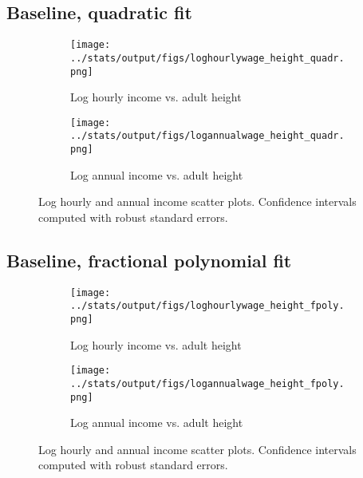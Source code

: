 \subsection{Baseline, quadratic fit}
\begin{figure}[htbp]
	\begin{subfigure}[b]{0.9\textwidth}
		\centering
		\texttt{[image: ../stats/output/figs/loghourlywage\_height\_quadr.png]}	
		\label{fig:loghourlywageheight}
		\caption{Log hourly income vs. adult height}
	\end{subfigure}
	
	\begin{subfigure}[b]{0.9\textwidth}
		\centering
		\texttt{[image: ../stats/output/figs/logannualwage\_height\_quadr.png]}	
		\label{fig:logannualwageheight}
		\caption{Log annual income vs. adult height}
	\end{subfigure}
	\caption{Log hourly and annual income scatter plots. Confidence intervals computed with robust standard errors.}
\end{figure}


\clearpage
\subsection{Baseline, fractional polynomial fit}
\begin{figure}[htbp]
	\begin{subfigure}[b]{0.9\textwidth}
		\centering
		\texttt{[image: ../stats/output/figs/loghourlywage\_height\_fpoly.png]}	
		\label{fig:loghourlywageheight}
		\caption{Log hourly income vs. adult height}
	\end{subfigure}
	
	\begin{subfigure}[b]{0.9\textwidth}
		\centering
		\texttt{[image: ../stats/output/figs/logannualwage\_height\_fpoly.png]}	
		\label{fig:logannualwageheight}
		\caption{Log annual income vs. adult height}
	\end{subfigure}
	\caption{Log hourly and annual income scatter plots. Confidence intervals computed with robust standard errors.}
\end{figure}


\clearpage
